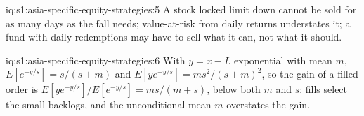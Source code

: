\begin{solution}{iq:s1:asia-specific-equity-strategies:5}
A stock locked limit down cannot be sold for as many days as the fall needs; value-at-risk from daily returns understates it; a fund with daily
redemptions may have to sell what it can, not what it should.
\end{solution}

\begin{solution}{iq:s1:asia-specific-equity-strategies:6}
With $y = x - L$ exponential with mean $m$, $E[e^{-y/s}] = s/(s + m)$ and $E[y e^{-y/s}] = m s^2/(s + m)^2$, so the gain of a filled order is
$E[y e^{-y/s}]/E[e^{-y/s}] = m s/(m + s)$, below both $m$ and $s$: fills select the small backlogs, and the unconditional mean $m$ overstates the gain.
\end{solution}
